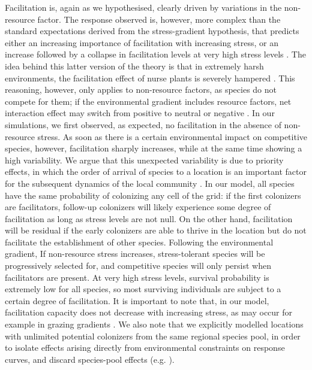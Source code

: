 Facilitation is, again as we hypothesised, clearly driven by variations in the non-resource factor. The response observed is, however, more complex than the standard expectations derived from the stress-gradient hypothesis, that predicts either an increasing importance of facilitation with increasing stress, or an increase followed by a collapse in facilitation levels at very high stress levels \citep{leRoux2010}. The idea behind this latter version of the theory is that in extremely harsh environments, the facilitation effect of nurse plants is severely hampered \citep{Michalet2006}. This reasoning, however, only applies to non-resource factors, as species do not compete for them; if the environmental gradient includes resource factors, net interaction effect may switch from positive to neutral or negative \citep{Smit2007,Michalet2014}. In our simulations, we first observed, as expected, no facilitation in the absence of non-resource stress. As soon as there is a certain environmental impact on competitive species, however, facilitation sharply increases, while at the same time showing a high variability. We argue that this unexpected variability is due to priority effects, in which the order of arrival of species to a location is an important factor for the subsequent dynamics of the local community \citep{Fukami2015}. In our model, all species have the same probability of colonizing any cell of the grid: if the first colonizers are facilitators, follow-up colonizers will likely experience some degree of facilitation as long as stress levels are not null. On the other hand, facilitation will be residual if the early colonizers are able to thrive in the location but do not facilitate the establishment of other species. Following the environmental gradient, If non-resource stress increases, stress-tolerant species will be progressively selected for, and competitive species will only persist when facilitators are present. At very high stress levels, survival probability is extremely low for all species, so most surviving individuals are subject to a certain degree of facilitation. It is important to note that, in our model, facilitation capacity does not decrease with increasing stress, as may occur for example in grazing gradients \citep{Smit2007}. We also note that we explicitly modelled locations with unlimited potential colonizers from the same regional species pool, in order to isolate effects arising directly from environmental constraints on response curves, and discard species-pool effects (e.g. \citealt{Partel1996}).

